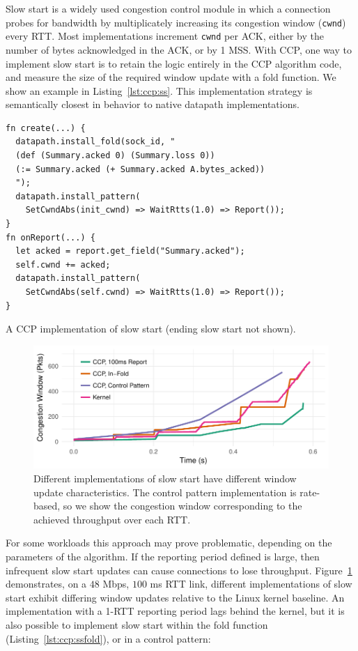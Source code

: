 Slow start is a widely used congestion control module in which a connection probes for bandwidth by multiplicately increasing its congestion window (\texttt{cwnd}) every RTT. Most implementations increment \texttt{cwnd} per ACK, either by the number of bytes acknowledged in the ACK, or by 1 MSS. With CCP, one way to implement slow start is to retain the logic entirely in the CCP algorithm code, and measure the size of the required window update with a fold function. We show an example in Listing~\ref{lst:ccp:ss}. This implementation strategy is semantically closest in behavior to native datapath implementations.

\begin{listing}[t]
{\footnotesize
\begin{verbatim}
fn create(...) {
  datapath.install_fold(sock_id, "
  (def (Summary.acked 0) (Summary.loss 0))
  (:= Summary.acked (+ Summary.acked A.bytes_acked))
  ");
  datapath.install_pattern(
    SetCwndAbs(init_cwnd) => WaitRtts(1.0) => Report());
}
fn onReport(...) {
  let acked = report.get_field("Summary.acked");
  self.cwnd += acked;
  datapath.install_pattern(
    SetCwndAbs(self.cwnd) => WaitRtts(1.0) => Report());
}
\end{verbatim}
}
\caption{A CCP implementation of slow start (ending slow start not shown).} \label{lst:ccp:ss}
\end{listing}

\begin{figure}
    \centering
    \includegraphics[width=\columnwidth]{img/ss-evo}
    \caption{Different implementations of slow start have different window update characteristics. The control pattern implementation is rate-based, so we show the congestion window corresponding to the achieved throughput over each RTT.}
    \label{fig:ccp:ss}
\end{figure}

For some workloads this approach may prove problematic, depending on the parameters of the algorithm. If the reporting period defined is large, then infrequent slow start updates can cause connections to lose throughput.
Figure~\ref{fig:ccp:ss} demonstrates, on a $48$ Mbps, $100$ ms RTT link, different implementations of slow start exhibit differing window updates relative to the Linux kernel baseline.
An implementation with a 1-RTT reporting period lags behind the kernel, but it is also possible to implement slow start within the fold function (Listing~\ref{lst:ccp:ssfold}), or in a control pattern: 

